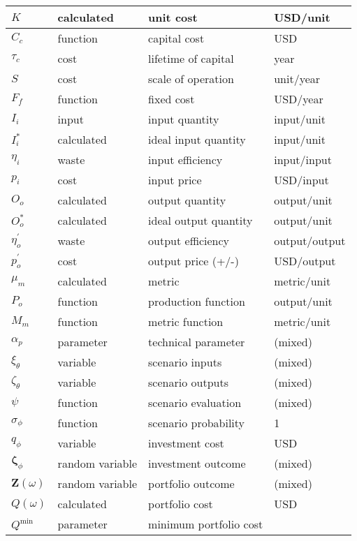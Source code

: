 \documentclass[letterpaper,10pt,english]{sphinxmanual}
\begin{document}
\begin{savenotes}
\begin{longtable}{|l|l|l|l|}
\(K\)
&
calculated
&
unit cost
&
USD/unit
\\
\hline
\(C_c\)
&
function
&
capital cost
&
USD
\\
\hline
\(\tau_c\)
&
cost
&
lifetime of capital
&
year
\\
\hline
\(S\)
&
cost
&
scale of operation
&
unit/year
\\
\hline
\(F_f\)
&
function
&
fixed cost
&
USD/year
\\
\hline
\(I_i\)
&
input
&
input quantity
&
input/unit
\\
\hline
\(I^*_i\)
&
calculated
&
ideal input quantity
&
input/unit
\\
\hline
\(\eta_i\)
&
waste
&
input efficiency
&
input/input
\\
\hline
\(p_i\)
&
cost
&
input price
&
USD/input
\\
\hline
\(O_o\)
&
calculated
&
output quantity
&
output/unit
\\
\hline
\(O^*_o\)
&
calculated
&
ideal output quantity
&
output/unit
\\
\hline
\(\eta^\prime_o\)
&
waste
&
output efficiency
&
output/output
\\
\hline
\(p^\prime_o\)
&
cost
&
output price (+/-)
&
USD/output
\\
\hline
\(\mu_m\)
&
calculated
&
metric
&
metric/unit
\\
\hline
\(P_o\)
&
function
&
production function
&
output/unit
\\
\hline
\(M_m\)
&
function
&
metric function
&
metric/unit
\\
\hline
\(\alpha_p\)
&
parameter
&
technical parameter
&
(mixed)
\\
\hline
\(\xi_\theta\)
&
variable
&
scenario inputs
&
(mixed)
\\
\hline
\(\zeta_\theta\)
&
variable
&
scenario outputs
&
(mixed)
\\
\hline
\(\psi\)
&
function
&
scenario evaluation
&
(mixed)
\\
\hline
\(\sigma_\phi\)
&
function
&
scenario probability
&
1
\\
\hline
\(q_\phi\)
&
variable
&
investment cost
&
USD
\\
\hline
\(\mathbf{\zeta}_\phi\)
&
random variable
&
investment outcome
&
(mixed)
\\
\hline
\(\mathbf{Z}(\omega)\)
&
random variable
&
portfolio outcome
&
(mixed)
\\
\hline
\(Q(\omega)\)
&
calculated
&
portfolio cost
&
USD
\\
\hline
\(Q^\mathrm{min}\)
&
parameter
&
minimum portfolio cost

\end{longtable}
\end{savenotes}
\end{document}

